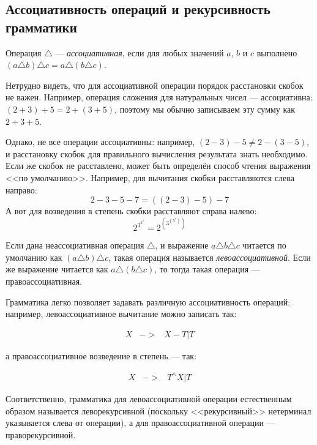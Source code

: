 \documentclass[12pt]{article}
\begin{document}
\subsection{Ассоциативность операций и рекурсивность грамматики}

\begin{definition}
Операция $\triangle$ --- \emph{ассоциативная}, если для любых значений $a$, $b$ и $c$
выполнено $(a \triangle b) \triangle c = a \triangle (b \triangle c)$.
\end{definition}

Нетрудно видеть, что для ассоциативной операции порядок расстановки скобок не важен.
Например, операция сложения для натуральных чисел --- ассоциативна:
$(2+3)+5 = 2+(3+5)$, поэтому мы обычно записываем эту сумму как $2+3+5$.

Однако, не все операции ассоциативны: например, $(2-3)-5 \ne 2-(3-5)$, и расстановку 
скобок для правильного вычисления результата знать необходимо.
Если же скобок не расставлено, может быть определён способ чтения выражения <<по умолчанию>>.
Например, для вычитания скобки расставляются слева направо:
$$2-3-5-7 = ((2-3)-5)-7$$
А вот для возведения в степень скобки расставляют справа налево:
$$2^{3^{5^7}} = 2^{\left(3^{\left(5^7\right)}\right)}$$

\begin{definition}
Если дана неассоциативная операция $\triangle$, и выражение $a \triangle b \triangle c$
читается по умолчанию как $(a \triangle b) \triangle c$, такая операция называется
\emph{левоассоциативной}. Если же выражение читается как $a \triangle (b \triangle c)$,
то тогда такая операция --- правоассоциативная.
\end{definition}

Грамматика легко позволяет задавать различную ассоциативность операций:
например, левоассоциативное вычитание можно записать так:
\begin{bnf}\begin{eqnarray*}
X &->& X-T | T
\end{eqnarray*}\end{bnf}%
а правоассоциативное возведение в степень --- так:
\begin{bnf}\begin{eqnarray*}
X &->& T^\wedge X | T
\end{eqnarray*}\end{bnf}%
Соответственно, грамматика для левоассоциативной операции естественным образом называется
леворекурсивной (поскольку <<рекурсивный>> нетерминал указывается слева от операции),
а для правоассоциативной операции --- праворекурсивной.
\end{document}
